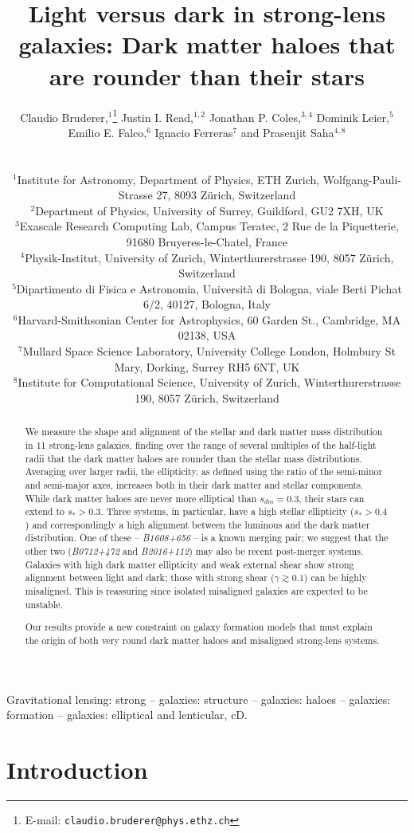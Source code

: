\documentclass[useAMS,usenatbib]{mn2e}
\title[Light versus dark in strong-lens galaxies]{Light versus dark in strong-lens galaxies: Dark matter haloes that are rounder than their stars}
\author[Bruderer et al.]
{\parbox{\textwidth}{Claudio Bruderer,$^{1}$\thanks{E-mail: \texttt{claudio.bruderer@phys.ethz.ch}}
Justin I. Read,$^{1,2}$
Jonathan P. Coles,$^{3,4}$
Dominik Leier,$^{5}$
Emilio E. Falco,$^{6}$
Ignacio Ferreras$^{7}$ and
Prasenjit Saha$^{4,8}$}\vspace{0.4cm}\\
\parbox{\textwidth}{$^{1}$Institute for Astronomy, Department of Physics, ETH Zurich, Wolfgang-Pauli-Strasse 27, 8093 Z\"urich, Switzerland\\
$^{2}$Department of Physics, University of Surrey, Guildford, GU2 7XH, UK\\
$^{3}$Exascale Research Computing Lab, Campus Teratec, 2 Rue de la Piquetterie, 91680 Bruyeres-le-Chatel, France\\
$^{4}$Physik-Institut, University of Zurich, Winterthurerstrasse 190, 8057 Z\"urich, Switzerland\\
$^{5}$Dipartimento di Fisica e Astronomia, Universit\`{a} di Bologna, viale Berti Pichat 6/2, 40127, Bologna, Italy\\
$^{6}$Harvard-Smithsonian Center for Astrophysics, 60 Garden St., Cambridge, MA 02138, USA\\
$^{7}$Mullard Space Science Laboratory, University College London, Holmbury St Mary, Dorking, Surrey RH5 6NT, UK\\
$^{8}$Institute for Computational Science, University of Zurich, Winterthurerstrasse 190, 8057 Z\"urich, Switzerland}}
\begin{document}
\maketitle

\begin{abstract}
We measure the shape and alignment of the stellar and dark matter mass distribution in 11 strong-lens galaxies, finding over the range of several multiples of the half-light radii that the dark matter haloes are rounder than the stellar mass distributions. Averaging over larger radii, the ellipticity, as defined using the ratio of the semi-minor and semi-major axes, increases both in their dark matter and stellar components. While dark matter haloes are never more elliptical than $s_{dm} = 0.3$, their stars can extend to $s_* > 0.3$. Three systems, in particular, have a high stellar ellipticity ($s_* > 0.4$) and correspondingly a high alignment between the luminous and the dark matter distribution. One of these -- {\it B1608+656} -- is a known merging pair; we suggest that the other two ({\it B0712+472} and {\it B2016+112}) may also be recent post-merger systems. Galaxies with high dark matter ellipticity and weak external shear show strong alignment between light and dark; those with strong shear ($\gamma \gtrsim 0.1$) can be highly misaligned. This is reassuring since isolated misaligned galaxies are expected to be unstable.

Our results provide a new constraint on galaxy formation models that must explain the origin of both very round dark matter haloes and misaligned strong-lens systems.

\end{abstract}

\begin{keywords}
Gravitational lensing: strong -- galaxies: structure -- galaxies: haloes -- galaxies: formation -- galaxies: elliptical and lenticular, cD.
\end{keywords}


\section{Introduction}\label{sec:introduction}
\end{document}
